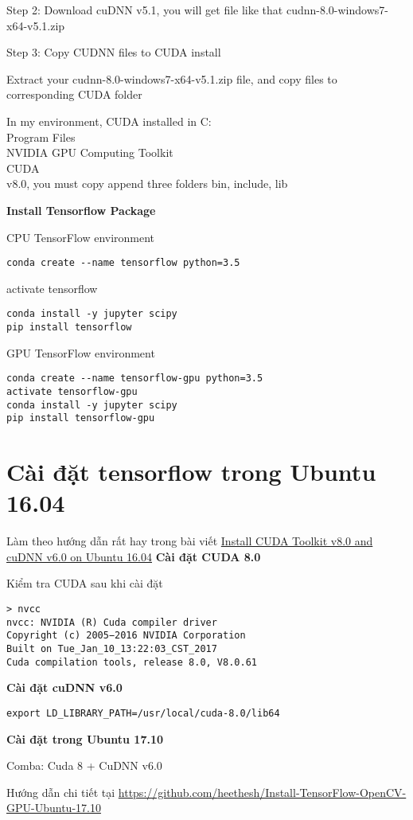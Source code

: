 Step 2: Download cuDNN v5.1, you will get file like that cudnn-8.0-windows7-x64-v5.1.zip


Step 3: Copy CUDNN files to CUDA install

Extract your cudnn-8.0-windows7-x64-v5.1.zip file, and copy files to corresponding CUDA folder

In my environment, CUDA installed in C:\\Program Files\\NVIDIA GPU Computing Toolkit\\CUDA\\v8.0, you must copy append three folders bin, include, lib


\textbf{Install Tensorflow Package}

CPU TensorFlow environment

\begin{lstlisting}
conda create --name tensorflow python=3.5
\end{lstlisting}

activate tensorflow

\begin{lstlisting}
conda install -y jupyter scipy
pip install tensorflow
\end{lstlisting}

GPU TensorFlow environment

\begin{lstlisting}
conda create --name tensorflow-gpu python=3.5
activate tensorflow-gpu
conda install -y jupyter scipy
pip install tensorflow-gpu
\end{lstlisting}

\section{Cài đặt tensorflow trong Ubuntu 16.04}

Làm theo hướng dẫn rất hay trong bài viết \href{https://gist.github.com/mjdietzx/0ff77af5ae60622ce6ed8c4d9b419f45}{Install CUDA Toolkit v8.0 and cuDNN v6.0 on Ubuntu 16.04}
\textbf{Cài đặt CUDA 8.0}

Kiểm tra CUDA sau khi cài đặt

\begin{lstlisting}
> nvcc
nvcc: NVIDIA (R) Cuda compiler driver
Copyright (c) 2005−2016 NVIDIA Corporation
Built on Tue_Jan_10_13:22:03_CST_2017
Cuda compilation tools, release 8.0, V8.0.61
\end{lstlisting}

\textbf{Cài đặt cuDNN v6.0}


\begin{lstlisting}
export LD_LIBRARY_PATH=/usr/local/cuda-8.0/lib64
\end{lstlisting}

\textbf{Cài đặt trong Ubuntu 17.10}

Comba: Cuda 8 + CuDNN v6.0


Hướng dẫn chi tiết tại \href{https://github.com/heethesh/Install-TensorFlow-OpenCV-GPU-Ubuntu-17.10}{https://github.com/heethesh/Install-TensorFlow-OpenCV-GPU-Ubuntu-17.10}